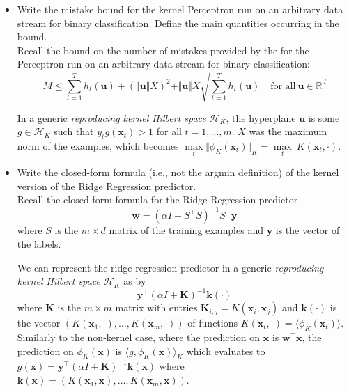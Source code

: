 \begin{itemize}
    \item Write the mistake bound for the kernel Perceptron run on an arbitrary data stream for binary classification. Define the main quantities occurring in the bound.\\ 

        Recall the bound on the number of mistakes provided by the for the Perceptron run on an arbitrary data stream for binary classification:
        $$
        M \leq \sum_{t=1}^{T} h_{t}(\boldsymbol{u}) + (\Vert \boldsymbol{u} \Vert X)^2 + \Vert \boldsymbol{u} \Vert X \sqrt{\sum_{t=1}^{T}h_t (\boldsymbol{u})} \quad \text{for all}\ \boldsymbol{u} \in \mathbb{R}^d    
        $$

        In a generic \textit{reproducing kernel Hilbert space} $\mathcal{H}_K$, the hyperplane $\boldsymbol{u}$ is some $g \in \mathcal{H}_K$ such that $y_t g(\boldsymbol{x}_t) > 1$ for all $t = 1, \dots, m$. $X$ was the maximum norm of the examples, which becomes $\underset{t}{\max} \Vert \phi_K(\boldsymbol{x}_t) \Vert_K = \underset{t}{\max} \ K(\boldsymbol{x}_t, \cdot)$.


    \item Write the closed-form formula (i.e., not the argmin definition) of the kernel version of the Ridge Regression predictor.\\
        
    Recall the closed-form formula for the Ridge Regression predictor    
    $$ 
    \boldsymbol{w} = \left(\alpha I + S^\top S\right)^{-1} S^\top \boldsymbol{y}
    $$
    where $S$ is the $m \times d$ matrix of the training examples and $\boldsymbol{y}$ is the vector of the labels. 

    We can represent the ridge regression predictor in a generic \textit{reproducing kernel Hilbert space} $\mathcal{H}_K$ as by 
    $$
    \boldsymbol{y}^\top \left(\alpha I + \boldsymbol{K} \right)^{-1} \boldsymbol{k}(\cdot)
    $$ 
    where $\boldsymbol{K}$ is the $m \times m$ matrix with entries $\boldsymbol{K}_{i,j} = K(\boldsymbol{x}_i, \boldsymbol{x}_j)$ and $\boldsymbol{k}(\cdot)$ is the vector $\left(K(\boldsymbol{x}_1, \cdot), \dots, K(\boldsymbol{x}_m, \cdot)\right)$ of functions $K(\boldsymbol{x}_t, \cdot) = \langle \phi_K(\boldsymbol{x}_t) \rangle$.
    Similarly to the non-kernel case, where the prediction on $\boldsymbol{x}$ is $\boldsymbol{w}^\top \boldsymbol{x}$, the prediction on $\phi_K(\boldsymbol{x})$ is $\langle g, \phi_K(\boldsymbol{x})\rangle_K$ which evaluates to $g(\boldsymbol{x}) = \boldsymbol{y}^\top \left(\alpha I + \boldsymbol{K} \right)^{-1} \boldsymbol{k}(\boldsymbol{x})$ where $\boldsymbol{k}(\boldsymbol{x}) = \left( K(\boldsymbol{x}_1,\boldsymbol{x}), \dots, K(\boldsymbol{x}_m, \boldsymbol{x}) \right)$.
\end{itemize}
